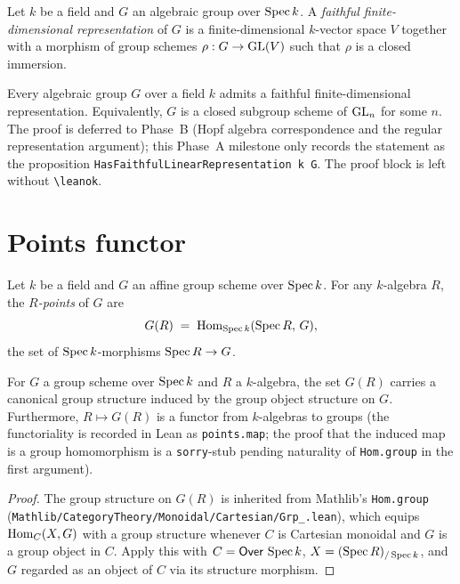 \begin{definition}\label{def:faithful-rep}
\leanok
{}
Let $k$ be a field and $G$ an algebraic group over $\operatorname{Spec} k$. A
\emph{faithful finite-dimensional representation} of $G$ is a finite-dimensional
$k$-vector space $V$ together with a morphism of group schemes
$\rho : G \to \mathrm{GL}(V)$ such that $\rho$ is a closed immersion.
\end{definition}

\begin{theorem}\label{thm:embedding-statement}
\leanok
{}
Every algebraic group $G$ over a field $k$ admits a faithful
finite-dimensional representation. Equivalently, $G$ is a closed subgroup
scheme of $\mathrm{GL}_n$ for some $n$. The proof is deferred to Phase~B (Hopf
algebra correspondence and the regular representation argument); this
Phase~A milestone only records the statement as the proposition
\texttt{HasFaithfulLinearRepresentation k G}. The proof block is left
without \texttt{\textbackslash leanok}.
\end{theorem}

\section{Points functor}

\begin{definition}\label{def:points}
\leanok
{}
Let $k$ be a field and $G$ an affine group scheme over $\operatorname{Spec} k$. For any
$k$-algebra $R$, the \emph{$R$-points} of $G$ are
\[
  G(R) \;=\; \operatorname{Hom}_{\operatorname{Spec} k}(\operatorname{Spec} R,\, G),
\]
the set of $\operatorname{Spec} k$-morphisms $\operatorname{Spec} R \to G$.
\end{definition}

\begin{lemma}[$G(R)$ is a group]\label{lem:points-group}
\leanok
{}
For $G$ a group scheme over $\operatorname{Spec} k$ and $R$ a $k$-algebra, the set $G(R)$
carries a canonical group structure induced by the group object structure on
$G$. Furthermore, $R \mapsto G(R)$ is a functor from $k$-algebras to groups
(the functoriality is recorded in Lean as \texttt{points.map}; the proof
that the induced map is a group homomorphism is a \texttt{sorry}-stub
pending naturality of \texttt{Hom.group} in the first argument).
\end{lemma}
\begin{proof}
\leanok
The group structure on $G(R)$ is inherited from Mathlib's \texttt{Hom.group}
(\texttt{Mathlib/CategoryTheory/Monoidal/Cartesian/Grp\_.lean}), which
equips $\operatorname{Hom}_C(X, G)$ with a group structure whenever $C$ is Cartesian
monoidal and $G$ is a group object in $C$. Apply this with $C = \mathsf{Over}\,\operatorname{Spec}
k$, $X = (\operatorname{Spec} R)_{/\operatorname{Spec} k}$, and $G$ regarded as an object of $C$ via
its structure morphism.
\end{proof}

